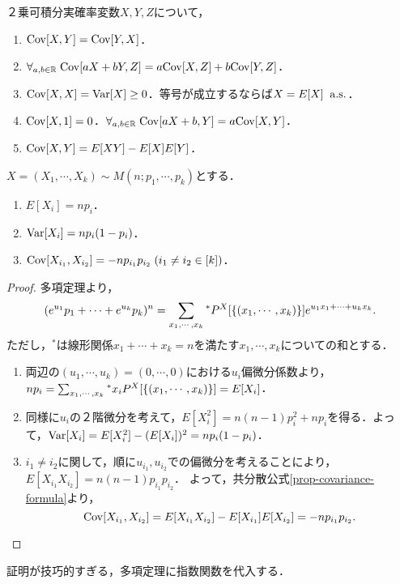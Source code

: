 \documentclass[uplatex,dvipdfmx]{jsreport}
\begin{document}
\begin{proposition}\label{prop-covariance-formula}
    ２乗可積分実確率変数$X,Y,Z$について，
    \begin{enumerate}
        \item $\mathrm{Cov}[X,Y]=\mathrm{Cov}[Y,X]$．
        \item $\forall_{a,b\in\mathbb{R}}\;\mathrm{Cov}[aX+bY,Z]=a\mathrm{Cov}[X,Z]+b\mathrm{Cov}[Y,Z]$．
        \item $\mathrm{Cov}[X,X]=\mathrm{Var}[X]\ge 0$．等号が成立するならば$X=E[X]\;\;\mathrm{a.s.}$．
        \item $\mathrm{Cov}[X,1]=0$．$\forall_{a,b\in\mathbb{R}}\;\mathrm{Cov}[aX+b,Y]=a\mathrm{Cov}[X,Y]$．
        \item $\mathrm{Cov}[X,Y]=E[XY]-E[X]E[Y]$．
    \end{enumerate}
\end{proposition}

\begin{example}[多項分布の共分散]
    $X=(X_1,\cdots,X_k)\sim M(n;p_1,\cdots,p_k)$とする．
    \begin{enumerate}
        \item $E[X_i]=np_i$．
        \item $\mathrm{Var}[X_i]=np_i(1-p_i)$．
        \item $\mathrm{Cov}[X_{i_1},X_{i_2}]=-np_{i_1}p_{i_2}\;(i_1\ne i_2\in[k])$．
    \end{enumerate}
\end{example}
\begin{proof}
    多項定理より，
    \[(e^{u_1}p_1+\cdots+e^{u_k}p_k)^n=\sum_{x_1,\cdots,x_k}{}^*P^X[\left\{(x_1,\cdots,x_k)\right\}]e^{u_1x_1+\cdots+u_kx_k}.\]
    ただし，${}^*$は線形関係$x_1+\cdots+x_k=n$を満たす$x_1,\cdots,x_k$についての和とする．
    \begin{enumerate}
        \item 両辺の$(u_1,\cdots,u_k)=(0,\cdots,0)$における$u_i$偏微分係数より，$np_i=\sum_{x_1,\cdots,x_k}{}^*x_iP^X[\left\{(x_1,\cdots,x_k)\right\}]=E[X_i]$．
        \item 同様に$u_i$の２階微分を考えて，$E[X_i^2]=n(n-1)p_i^2+np_i$を得る．よって，$\mathrm{Var}[X_i]=E[X_i^2]-(E[X_i])^2=np_i(1-p_i)$．
        \item $i_1\ne i_2$に関して，順に$u_{i_1},u_{i_2}$での偏微分を考えることにより，$E[X_{i_1}X_{i_2}]=n(n-1)p_{i_1}p_{i_2}$．
        よって，共分散公式\ref{prop-covariance-formula}より，
        \[\mathrm{Cov}[X_{i_1},X_{i_2}]=E[X_{i_1}X_{i_2}]-E[X_{i_1}]E[X_{i_2}]=-np_{i_1}p_{i_2}.\]
    \end{enumerate}
\end{proof}
\begin{remarks}
    証明が技巧的すぎる，多項定理に指数関数を代入する．
\end{remarks}
\end{document}
